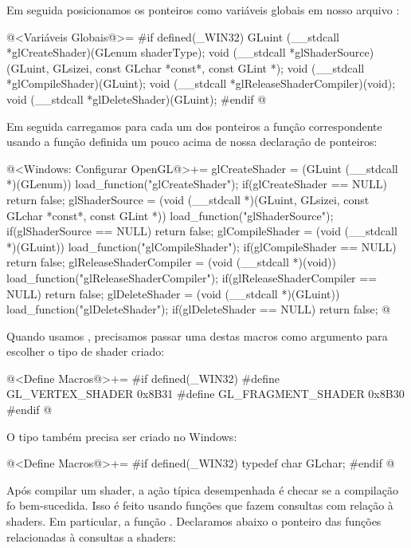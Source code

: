 Em seguida posicionamos os ponteiros como variáveis globais em nosso
arquivo :

\iniciocodigo
@<Variáveis Globais@>=
#if defined(_WIN32)
GLuint (__stdcall *glCreateShader)(GLenum shaderType);
void (__stdcall *glShaderSource)(GLuint, GLsizei, const GLchar *const*,
                                 const GLint *);
void (__stdcall *glCompileShader)(GLuint);
void (__stdcall *glReleaseShaderCompiler)(void);
void (__stdcall *glDeleteShader)(GLuint);
#endif
@
\fimcodigo

Em seguida carregamos para cada um dos ponteiros a função
correspondente usando a função definida um pouco acima de nossa
declaração de ponteiros:

\iniciocodigo
@<Windows: Configurar OpenGL@>+=
glCreateShader = (GLuint (__stdcall *)(GLenum)) load_function("glCreateShader");
if(glCreateShader == NULL)
  return false;
glShaderSource = (void (__stdcall *)(GLuint, GLsizei, const GLchar *const*,
                                     const GLint *))
                 load_function("glShaderSource");
if(glShaderSource == NULL)
  return false;
glCompileShader = (void (__stdcall *)(GLuint)) load_function("glCompileShader");
if(glCompileShader == NULL)
  return false;
glReleaseShaderCompiler = (void (__stdcall *)(void))
                             load_function("glReleaseShaderCompiler");
if(glReleaseShaderCompiler == NULL)
  return false;
glDeleteShader = (void (__stdcall *)(GLuint)) load_function("glDeleteShader");
if(glDeleteShader == NULL)
  return false;
@
\fimcodigo

Quando usamos , precisamos passar uma
destas macros como argumento para escolher o tipo de shader criado:

\iniciocodigo
@<Define Macros@>+=
#if defined(_WIN32)
#define GL_VERTEX_SHADER          0x8B31
#define GL_FRAGMENT_SHADER        0x8B30
#endif
@
\fimcodigo

O tipo  também precisa ser criado no Windows:

\iniciocodigo
@<Define Macros@>+=
#if defined(_WIN32)
typedef char  GLchar;
#endif
@
\fimcodigo

Após compilar um shader, a ação típica desempenhada é checar se a
compilação fo bem-sucedida. Isso é feito usando funções que fazem
consultas com relação à shaders. Em particular, a
função . Declaramos abaixo o ponteiro das
funções relacionadas à consultas a shaders:

